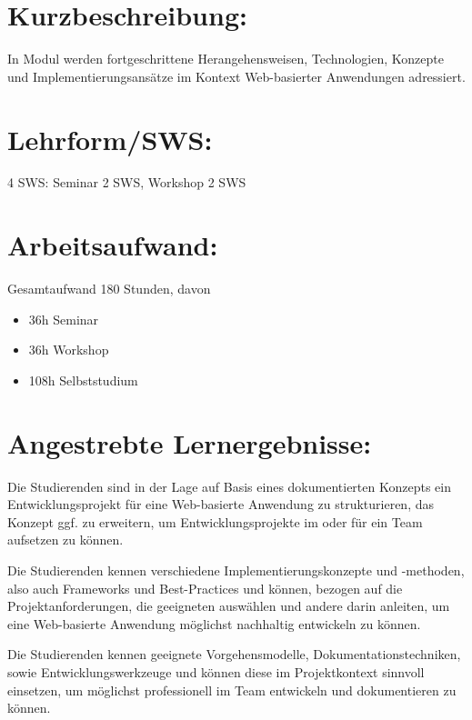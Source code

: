\section*{Kurzbeschreibung:}\label{kurzbeschreibung-15}

In Modul werden fortgeschrittene Herangehensweisen, Technologien,
Konzepte und Implementierungsansätze im Kontext Web-basierter
Anwendungen adressiert.

\section*{Lehrform/SWS:}\label{lehrformsws-23}

4 SWS: Seminar 2 SWS, Workshop 2 SWS

\section*{Arbeitsaufwand:}\label{arbeitsaufwand-24}

Gesamtaufwand 180 Stunden, davon

\begin{itemize}
\tightlist
\item
  36h Seminar
\item
  36h Workshop
\item
  108h Selbststudium
\end{itemize}

\section*{Angestrebte
Lernergebnisse:}\label{angestrebte-lernergebnisse-23}

Die Studierenden sind in der Lage auf Basis eines dokumentierten
Konzepts ein Entwicklungsprojekt für eine Web-basierte Anwendung zu
strukturieren, das Konzept ggf. zu erweitern, um Entwicklungsprojekte im
oder für ein Team aufsetzen zu können.

Die Studierenden kennen verschiedene Implementierungskonzepte und
-methoden, also auch Frameworks und Best-Practices und können, bezogen
auf die Projektanforderungen, die geeigneten auswählen und andere darin
anleiten, um eine Web-basierte Anwendung möglichst nachhaltig entwickeln
zu können.

Die Studierenden kennen geeignete Vorgehensmodelle,
Dokumentationstechniken, sowie Entwicklungswerkzeuge und können diese im
Projektkontext sinnvoll einsetzen, um möglichst professionell im Team
entwickeln und dokumentieren zu können.

